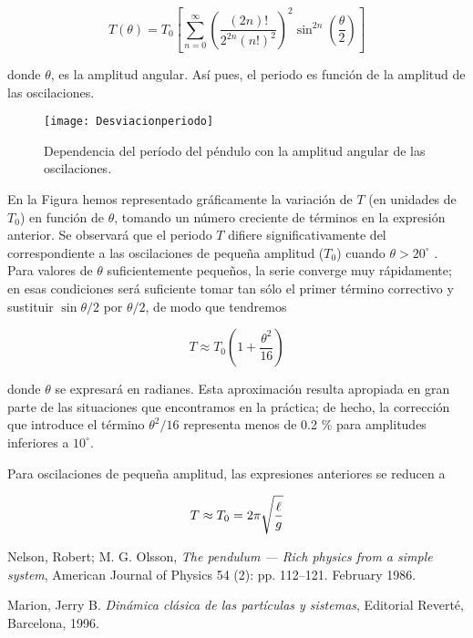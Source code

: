 \documentclass[12pt,spanish]{article}
\begin{document}
    \[T\left(\theta\right) = T_{0}\left[\sum_{n=0}^{\infty} \left(\frac{(2n)!}{2^{2n}(n!)^{2}}\right)^{2}\sin^{2n}\left(\frac{\theta}{2}\right)\right]\]
    
donde $\theta$, es la amplitud angular. Así pues, el periodo es función de la amplitud de las oscilaciones.

 \begin{figure}[!ht]
   \centering
     \texttt{[image: Desviacionperiodo]}
   \caption{Dependencia del período del péndulo con la amplitud angular de las oscilaciones.}
 \end{figure}

En la Figura hemos representado gráficamente la variación de $T$ (en unidades de $T_0$) en función de $\theta$, tomando un número creciente de términos en la expresión anterior. Se observará que el periodo $T$ difiere significativamente del correspondiente a las oscilaciones de pequeña amplitud ($T_0$) cuando $\theta > 20^{\circ}$ . Para valores de $\theta$ suficientemente pequeños, la serie converge muy rápidamente; en esas condiciones será suficiente tomar tan sólo el primer término correctivo y sustituir $\sin\theta/2$ por $\theta/2$, de modo que tendremos

    \[T \approx T_0 \left ( 1 + \frac{\theta^2}{16} \right )\]

donde $\theta$ se expresará en radianes. Esta aproximación resulta apropiada en gran parte de las situaciones que encontramos en la práctica; de hecho, la corrección que introduce el término $\theta^2/16$ representa menos de 0.2 \% para amplitudes inferiores a $10^{\circ}$.

Para oscilaciones de pequeña amplitud, las expresiones anteriores se reducen a

    \[T \approx T_0 = 2 \pi \sqrt{\ell\over g}\]

\begin{thebibliography}{9}

  Nelson, Robert; M. G. Olsson,
  \emph{The pendulum — Rich physics from a simple system},
  American Journal of Physics 54 (2): pp. 112–121.
  February 1986.

 Marion, Jerry B.
 \emph{Dinámica clásica de las partículas y sistemas},
 Editorial Reverté, Barcelona, 1996.



\end{thebibliography}
\end{document}
